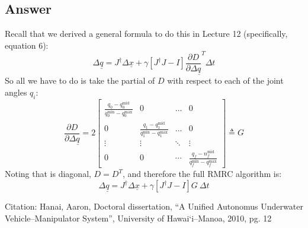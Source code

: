 \documentclass[]{article}
\begin{document}
\subsection{Answer}
Recall that we derived a general formula to do this in Lecture 12 (specifically, equation 6):
\begin{displaymath}
\Delta\underline{q} = J^{\dag}\Delta\underline{x} + \gamma \left[ J^{\dag}J-I\right] \frac{\partial D}{\partial \Delta\underline{q}}^{T}\Delta t
\end{displaymath}
So all we have to do is take the partial of $D$ with respect to each of the joint angles $q_{i}$:
\begin{displaymath}
	\frac{\partial D}{\partial \Delta\underline{q}} = 2\left[
		\begin{matrix}
			\frac{q_{0} - q_{0}^{\mathrm{mid}}}{q_{0}^{\mathrm{min}} - q_{0}^{\mathrm{max}}} & 0 & \dots & 0 \\
			0 & \frac{q_{1} - q_{1}^{\mathrm{mid}}}{q_{1}^{\mathrm{min}} - q_{1}^{\mathrm{max}}} & \dots & 0 \\
			\vdots & \vdots & \ddots & \vdots \\
			0 & 0 & \cdots & \frac{q_{f} - n_{f}^{\mathrm{mid}}}{q_{f}^{\mathrm{min}} - q_{f}^{\mathrm{max}}}
		\end{matrix} \right] \triangleq G
\end{displaymath}
Noting that is diagonal, $D=D^{T}$, and therefore the full RMRC algorithm is:
\begin{displaymath}
\Delta\underline{q} = J^{\dag}\Delta\underline{x} + \gamma \left[ J^{\dag}J-I\right]G\ \Delta t
\end{displaymath}

Citation: Hanai, Aaron, Doctoral dissertation, ``A Unified Autonomus Underwater Vehicle--Manipulator System'', University of Hawai`i--Manoa, 2010, pg. 12
\end{document}
